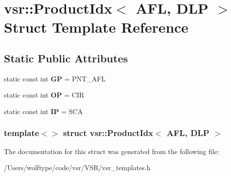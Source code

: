 \hypertarget{structvsr_1_1_product_idx_3_01_a_f_l_00_01_d_l_p_01_4}{\section{vsr\-:\-:Product\-Idx$<$ A\-F\-L, D\-L\-P $>$ Struct Template Reference}
\label{structvsr_1_1_product_idx_3_01_a_f_l_00_01_d_l_p_01_4}
}
\subsection*{Static Public Attributes}
\begin{DoxyCompactItemize}
\item 
\hypertarget{structvsr_1_1_product_idx_3_01_a_f_l_00_01_d_l_p_01_4_a308729d3434ff18473bc4171197c4283}{static const int {\bfseries G\-P} = P\-N\-T\-\_\-\-A\-F\-L}\label{structvsr_1_1_product_idx_3_01_a_f_l_00_01_d_l_p_01_4_a308729d3434ff18473bc4171197c4283}

\item 
\hypertarget{structvsr_1_1_product_idx_3_01_a_f_l_00_01_d_l_p_01_4_a259a55aa0f3bd3751042e64c2c54860b}{static const int {\bfseries O\-P} = C\-I\-R}\label{structvsr_1_1_product_idx_3_01_a_f_l_00_01_d_l_p_01_4_a259a55aa0f3bd3751042e64c2c54860b}

\item 
\hypertarget{structvsr_1_1_product_idx_3_01_a_f_l_00_01_d_l_p_01_4_a3e9760210acc4e5bf968041b3427da24}{static const int {\bfseries I\-P} = S\-C\-A}\label{structvsr_1_1_product_idx_3_01_a_f_l_00_01_d_l_p_01_4_a3e9760210acc4e5bf968041b3427da24}

\end{DoxyCompactItemize}
\subsubsection*{template$<$$>$ struct vsr\-::\-Product\-Idx$<$ A\-F\-L, D\-L\-P $>$}



The documentation for this struct was generated from the following file\-:\begin{DoxyCompactItemize}
\item 
/\-Users/wolftype/code/vsr/\-V\-S\-R/vsr\-\_\-templates.\-h\end{DoxyCompactItemize}
